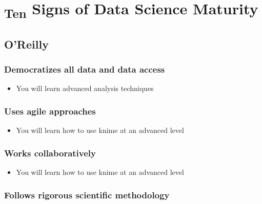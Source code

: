 \hypertarget{ten-signs-of-data-science-maturity}{%
\section{\texorpdfstring{\textsubscript{Ten} Signs of Data Science
Maturity}{Ten Signs of Data Science Maturity}}\label{ten-signs-of-data-science-maturity}}

\hypertarget{oreilly}{%
\subsection{O'Reilly}\label{oreilly}}

\hypertarget{democratizes-all-data-and-data-access}{%
\subsubsection{Democratizes all data and data
access}\label{democratizes-all-data-and-data-access}}

\begin{itemize}
\tightlist
\item
  You will learn advanced analysis techniques
\end{itemize}

\hypertarget{uses-agile-approaches}{%
\subsubsection{Uses agile approaches}\label{uses-agile-approaches}}

\begin{itemize}
\tightlist
\item
  You will learn how to use knime at an advanced level
\end{itemize}

\hypertarget{works-collaboratively}{%
\subsubsection{Works collaboratively}\label{works-collaboratively}}

\begin{itemize}
\tightlist
\item
  You will learn how to use knime at an advanced level
\end{itemize}

\hypertarget{follows-rigorous-scientific-methodology}{%
\subsubsection{Follows rigorous scientific
methodology}\label{follows-rigorous-scientific-methodology}}

